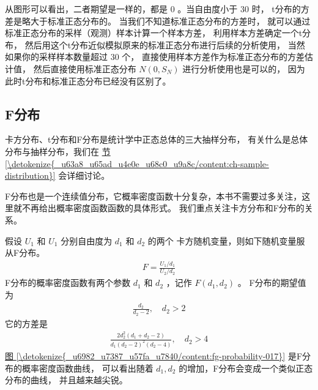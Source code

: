 \documentclass[letterpaper,10pt,english]{sphinxmanual}
\begin{document}
从图形可以看出，二者期望是一样的，都是 \(0\)
。当自由度小于 \(30\) 时，
t分布的方差是略大于标准正态分布的。
当我们不知道标准正态分布的方差时，
就可以通过标准正态分布的采样（观测）样本计算一个样本方差，
利用样本方差确定一个t分布，
然后用这个t分布近似模拟原来的标准正态分布进行后续的分析使用，
当然如果你的采样样本数量超过 \(30\) 个，
直接使用样本方差作为标准正态分布的方差估计值，
然后直接使用标准正态分布 \(N(0,S_N)\) 进行分析使用也是可以的，
因为此时t分布和标准正态分布已经没有区别了。


\subsection{F分布}
\label{\detokenize{_u6982_u7387_u57fa_u7840/content:f}}
卡方分布、t分布和F分布是统计学中正态总体的三大抽样分布，
有关什么是总体分布与抽样分布，我们在 \hyperref[\detokenize{_u63a8_u65ad_u4e0e_u68c0_u9a8c/content:ch-sample-distribution}]{节 \ref{\detokenize{_u63a8_u65ad_u4e0e_u68c0_u9a8c/content:ch-sample-distribution}}}
会详细讨论。

F分布也是一个连续值分布，它概率密度函数十分复杂，本书不需要过多关注，这里就不再给出概率密度函数函数的具体形式。
我们重点关注卡方分布和F分布的关系。

假设 \(U_1\) 和 \(U_1\) 分别自由度为 \(d_1\) 和 \(d_2\)
的两个  卡方随机变量，则如下随机变量服从F分布。
\begin{equation}\label{equation:概率基础/content:概率基础/content:86}
\begin{split}F = \frac{U_1/d_1}{U_2/d_2}\end{split}
\end{equation}
F分布的概率密度函数有两个参数 \(d_1\) 和 \(d_2\)
，记作 \(F(d_1,d_2)\) 。
F分布的期望值为
\begin{equation}\label{equation:概率基础/content:概率基础/content:87}
\begin{split}\frac{d_2}{d_2-2},\quad d_2 > 2\end{split}
\end{equation}
它的方差是
\begin{equation}\label{equation:概率基础/content:概率基础/content:88}
\begin{split}\frac{2d_2^2(d_1+d_2-2)}{d_1(d_2-2)^2(d_2-4)}, \quad d_2 > 4\end{split}
\end{equation}
\hyperref[\detokenize{_u6982_u7387_u57fa_u7840/content:fg-probability-017}]{图 \ref{\detokenize{_u6982_u7387_u57fa_u7840/content:fg-probability-017}}} 是F分布的概率密度函数曲线，
可以看出随着 \(d_1,d_2\) 的增加，F分布会变成一个类似正态分布的曲线，
并且越来越尖锐。
\end{document}
